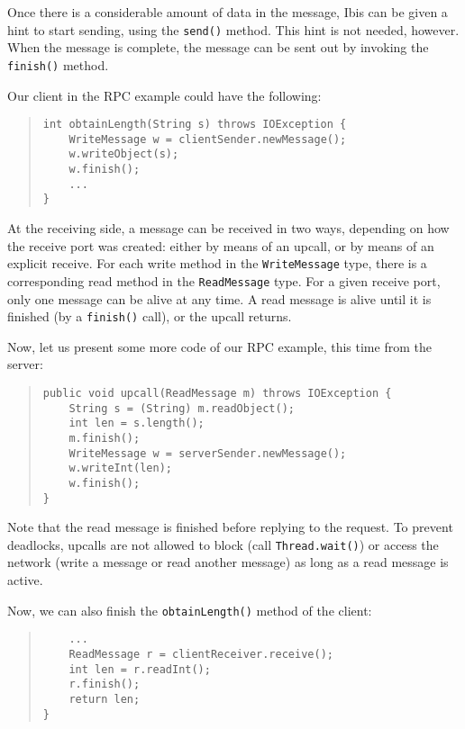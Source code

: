 \documentclass[10pt]{article}
\begin{document}
Once there is a considerable amount of data in the message, Ibis
can be given a hint to start sending, using the \texttt{send()}
method. This hint is not needed, however. When the message is
complete, the message can be sent out by invoking the
\texttt{finish()} method.

Our client in the RPC example could have the following:
\begin{quote}
\begin{verbatim}
int obtainLength(String s) throws IOException {
    WriteMessage w = clientSender.newMessage();
    w.writeObject(s);
    w.finish();
    ...
}
\end{verbatim}
\end{quote}

\noindent
At the receiving side, a message can be received in two ways,
depending on how the receive port was created: either by means of an
upcall, or by means of an explicit receive. For each write method
in the \texttt{WriteMessage} type, there is a corresponding read method in
the \texttt{ReadMessage} type. For a given receive port, only one message can
be alive at any time. A read message is alive until it is
finished (by a \texttt{finish()} call), or the upcall returns.

Now, let us present some more code of our RPC example, this time
from the server:

\begin{quote}
\begin{verbatim}
public void upcall(ReadMessage m) throws IOException {
    String s = (String) m.readObject();
    int len = s.length();
    m.finish();
    WriteMessage w = serverSender.newMessage();
    w.writeInt(len);
    w.finish();
}
\end{verbatim}
\end{quote}

\noindent
Note that the read message is finished before replying to the
request. To prevent deadlocks, upcalls are not allowed to block
(call \texttt{Thread.wait()}) or access the network (write a message or
read another message) as long as a read message is active.

Now, we can also finish the \texttt{obtainLength()} method of the client:
\begin{quote}
\begin{verbatim}
    ...
    ReadMessage r = clientReceiver.receive();
    int len = r.readInt();
    r.finish();
    return len;
}
\end{verbatim}
\end{quote}
\end{document}
